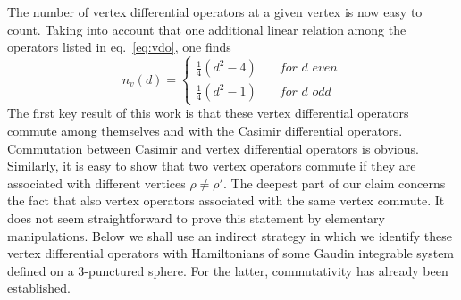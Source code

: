 \documentclass{article}
\begin{document}
The number of vertex differential operators at a given vertex is now easy to count. 
Taking into account that one additional linear relation among the operators 
listed in eq.\ \eqref{eq:vdo}, one finds 
\begin{equation} \label{eq:novertfull} 
n_v(d) = \left\{ \begin{array}{ll} \frac14(d^2-4) \quad & \textit{for d even}\\[2mm]
\frac14(d^2-1) \quad & \textit{for d odd} \end{array}\right.  
\end{equation} 
The first key result of this work is that these vertex differential operators
commute among themselves and with the Casimir differential operators. Commutation 
between Casimir and vertex differential operators is obvious. Similarly, it is 
easy to show that two vertex operators commute if they are associated with 
different vertices $\rho \neq \rho'$. The deepest part of our claim concerns the 
fact that also vertex operators associated with the same vertex commute. It does 
not seem straightforward to prove this statement by elementary manipulations. Below 
we shall use an indirect strategy in which we identify these vertex differential 
operators with Hamiltonians of some Gaudin integrable system defined on a 
3-punctured sphere. For the latter, commutativity has already been established. 
\end{document}
